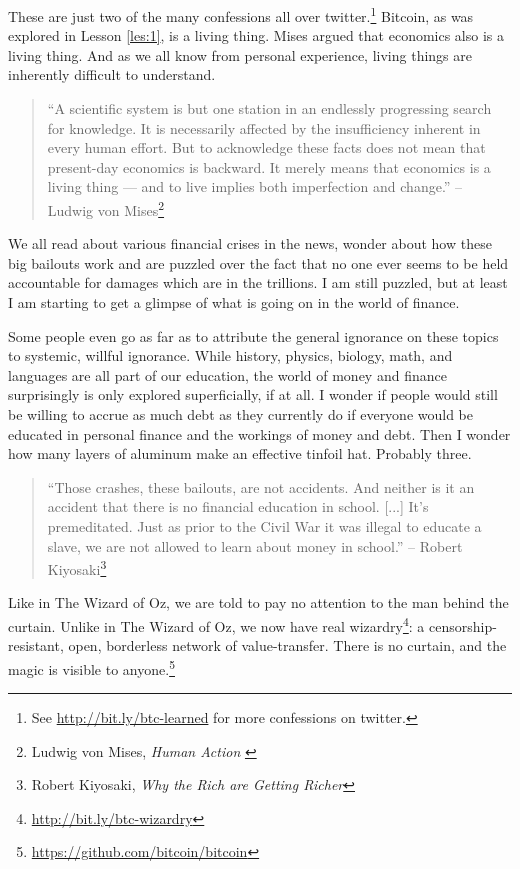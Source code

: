 These are just two of the many confessions all over twitter.\footnote{See
\url{http://bit.ly/btc-learned} for more confessions on twitter.} Bitcoin, as
was explored in Lesson \ref{les:1}, is a living thing. Mises argued that
economics also is a living thing. And as we all know from personal experience,
living things are inherently difficult to understand.

\begin{quotation}
``A scientific system is but one station in an endlessly progressing
search for knowledge. It is necessarily affected by the insufficiency
inherent in every human effort. But to acknowledge these facts does
not mean that present-day economics is backward. It merely means that
economics is a living thing --- and to live implies both imperfection
and change.''
\flushright -- Ludwig von Mises\footnote{Ludwig von Mises, \textit{Human Action}
\cite{human-action}}
\end{quotation}

We all read about various financial crises in the news, wonder about how
these big bailouts work and are puzzled over the fact that no one ever
seems to be held accountable for damages which are in the trillions. I
am still puzzled, but at least I am starting to get a glimpse of what is
going on in the world of finance.

Some people even go as far as to attribute the general ignorance on
these topics to systemic, willful ignorance. While history, physics,
biology, math, and languages are all part of our education, the world of
money and finance surprisingly is only explored superficially, if at
all. I wonder if people would still be willing to accrue as much debt as
they currently do if everyone would be educated in personal finance and
the workings of money and debt. Then I wonder how many layers of
aluminum make an effective tinfoil hat. Probably three.

\begin{quotation}
``Those crashes, these bailouts, are not accidents. And neither is it an
accident that there is no financial education in school. [...] It's
premeditated. Just as prior to the Civil War it was illegal to educate a slave,
we are not allowed to learn about money in school.''
\flushright -- Robert Kiyosaki\footnote{Robert Kiyosaki, \textit{Why the Rich
are Getting Richer}\cite{robert-kiyosaki}}
\end{quotation}

Like in The Wizard of Oz, we are told to pay no attention to the man behind the
curtain. Unlike in The Wizard of Oz, we now have real
wizardry\footnote{\url{http://bit.ly/btc-wizardry}}: a censorship-resistant,
open, borderless network of value-transfer. There is no curtain, and the magic
is visible to anyone.\footnote{\url{https://github.com/bitcoin/bitcoin}}

